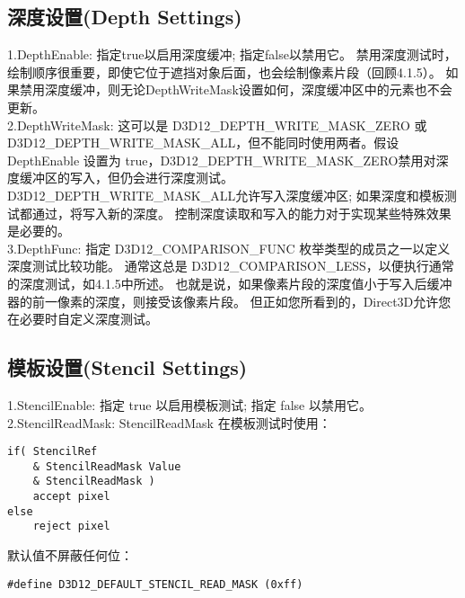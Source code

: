 \subsection{深度设置(Depth Settings)}
\begin{flushleft}
1.DepthEnable: 指定true以启用深度缓冲; 指定false以禁用它。 禁用深度测试时，绘制顺序很重要，即使它位于遮挡对象后面，也会绘制像素片段（回顾4.1.5）。 如果禁用深度缓冲，则无论DepthWriteMask设置如何，深度缓冲区中的元素也不会更新。\\

2.DepthWriteMask: 这可以是 D3D12\_DEPTH\_WRITE\_MASK\_ZERO 或 D3D12\_DEPTH\_WRITE\_MASK\_ALL，但不能同时使用两者。假设 DepthEnable 设置为 true，D3D12\_DEPTH\_WRITE\_MASK\_ZERO禁用对深度缓冲区的写入，但仍会进行深度测试。D3D12\_DEPTH\_WRITE\_MASK\_ALL允许写入深度缓冲区; 如果深度和模板测试都通过，将写入新的深度。 控制深度读取和写入的能力对于实现某些特殊效果是必要的。\\

3.DepthFunc: 指定 D3D12\_COMPARISON\_FUNC 枚举类型的成员之一以定义深度测试比较功能。 通常这总是 D3D12\_COMPARISON\_LESS，以便执行通常的深度测试，如4.1.5中所述。 也就是说，如果像素片段的深度值小于写入后缓冲器的前一像素的深度，则接受该像素片段。 但正如您所看到的，Direct3D允许您在必要时自定义深度测试。\\
\end{flushleft}

\subsection{模板设置(Stencil Settings)}
\begin{flushleft}
1.StencilEnable: 指定 true 以启用模板测试; 指定 false 以禁用它。\\
2.StencilReadMask: StencilReadMask 在模板测试时使用：\\
\end{flushleft}

\begin{lstlisting}
if( StencilRef 
    & StencilReadMask Value 
    & StencilReadMask )
    accept pixel
else
    reject pixel
\end{lstlisting}

\begin{flushleft}
默认值不屏蔽任何位：\\
\end{flushleft}
\begin{lstlisting}
#define D3D12_DEFAULT_STENCIL_READ_MASK (0xff)
\end{lstlisting}

